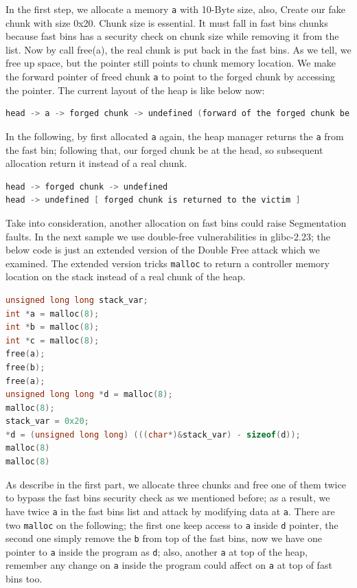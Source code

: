 \documentclass{masterthesis}
\newcommand*\libc{glibc}
\newcommand*\fb{fast bins}
\newcommand*\mallocc{\lstinline{malloc}}
\begin{document}
In the first step, we allocate a memory \lstinline{a} with 10-Byte size, also, Create our fake chunk with size 0x20. Chunk size is essential. It must fall in \fb{} chunks because \fb{} has a security check on chunk size while removing it from the list.
Now by call free(a), the real chunk is put back in the \fb{}. As we tell, we free up space, but the pointer still points to chunk memory location. We make the forward pointer of freed chunk \lstinline{a} to point to the forged chunk by accessing the pointer. The current layout of the heap is like below now:

\begin{lstlisting}[language=c,frame=tlrb]
head -> a -> forged chunk -> undefined (forward of the forged chunk be holding attacker's data)
\end{lstlisting}

In the following, by first allocated \lstinline{a} again, the heap manager returns the \lstinline{a} from the fast bin; following that, our forged chunk be at the head, so subsequent allocation return it instead of a real chunk.

\begin{lstlisting}[language=c,frame=tlrb]
head -> forged chunk -> undefined
head -> undefined [ forged chunk is returned to the victim ]
\end{lstlisting}

Take into consideration, another allocation on \fb{} could raise Segmentation faults.
In the next sample we use double-free vulnerabilities in \libc{-2.23}; the below code is just an extended version of the Double Free attack which we examined. The extended version tricks \mallocc{} to return a controller memory location on the stack instead of a real chunk of the heap.

\begin{lstlisting}[language=c,frame=tlrb]
unsigned long long stack_var;
int *a = malloc(8);
int *b = malloc(8);
int *c = malloc(8);
free(a);
free(b);
free(a);
unsigned long long *d = malloc(8);
malloc(8);
stack_var = 0x20;
*d = (unsigned long long) (((char*)&stack_var) - sizeof(d));
malloc(8)
malloc(8)
\end{lstlisting}

As describe in the first part, we allocate three chunks and free one of them twice to bypass the \fb{} security check as we mentioned before; as a result, we have twice \lstinline{a} in the \fb{} list and attack by modifying data at \lstinline{a}. There are two \mallocc{} on the following; the first one keep access to \lstinline{a} inside \lstinline{d} pointer, the second one simply remove the \lstinline{b} from top of the \fb{}, now we have one pointer to \lstinline{a} inside the program as \lstinline{d}; also, another \lstinline{a} at top of the heap, remember any change on \lstinline{a} inside the program could affect on \lstinline{a} at top of \fb{} too.
\end{document}
